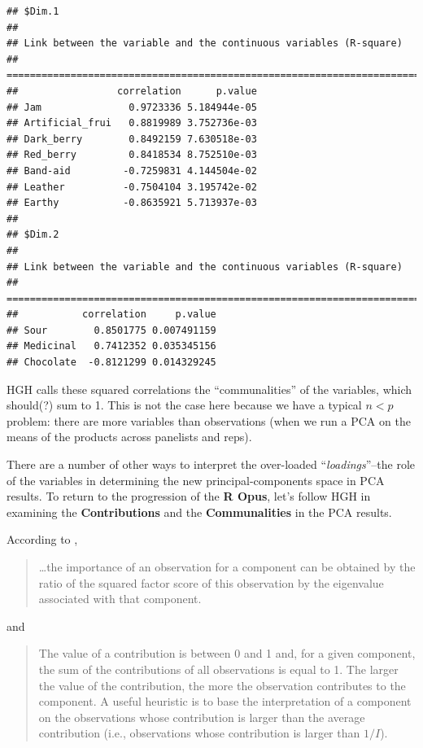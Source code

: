 \documentclass[
]{book}
\begin{document}
\begin{verbatim}
## $Dim.1
## 
## Link between the variable and the continuous variables (R-square)
## =================================================================================
##                 correlation      p.value
## Jam               0.9723336 5.184944e-05
## Artificial_frui   0.8819989 3.752736e-03
## Dark_berry        0.8492159 7.630518e-03
## Red_berry         0.8418534 8.752510e-03
## Band-aid         -0.7259831 4.144504e-02
## Leather          -0.7504104 3.195742e-02
## Earthy           -0.8635921 5.713937e-03
## 
## $Dim.2
## 
## Link between the variable and the continuous variables (R-square)
## =================================================================================
##           correlation     p.value
## Sour        0.8501775 0.007491159
## Medicinal   0.7412352 0.035345156
## Chocolate  -0.8121299 0.014329245
\end{verbatim}

HGH calls these squared correlations the ``communalities'' of the variables, which should(?) sum to 1. This is not the case here because we have a typical \(n<p\) problem: there are more variables than observations (when we run a PCA on the means of the products across panelists and reps).

There are a number of other ways to interpret the over-loaded ``\emph{loadings}''--the role of the variables in determining the new principal-components space in PCA results. To return to the progression of the \textbf{R Opus}, let's follow HGH in examining the \textbf{Contributions} and the \textbf{Communalities} in the PCA results.

According to \citet[p.8-9]{abdiPrincipal2010},

\begin{quote}
\ldots the importance of an observation for a component can be obtained by the ratio of the squared factor score of this observation by the eigenvalue associated with that component.
\end{quote}

and

\begin{quote}
The value of a contribution is between 0 and 1 and, for a given component, the sum of the contributions of all observations is equal to 1. The larger the value of the contribution, the more the observation contributes to the component. A useful heuristic is to base the interpretation of a component on the observations whose contribution is larger than the average contribution (i.e., observations whose contribution is larger than \(1/I\)).
\end{quote}
\end{document}
